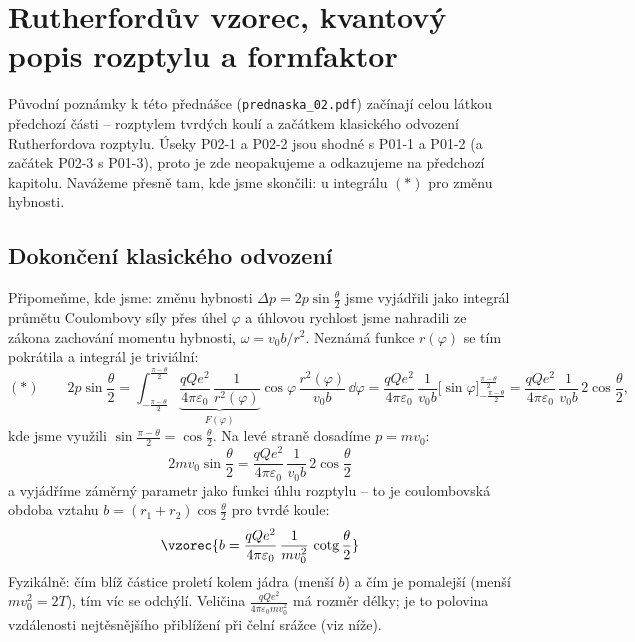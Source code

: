 \section{Rutherfordův vzorec, kvantový popis rozptylu a formfaktor}

Původní poznámky k této přednášce (\texttt{prednaska\_02.pdf}) začínají celou látkou předchozí části -- rozptylem tvrdých koulí a začátkem klasického odvození Rutherfordova rozptylu. Úseky P02-1 a P02-2 jsou shodné s P01-1 a P01-2 (a začátek P02-3 s P01-3), proto je zde neopakujeme a odkazujeme na předchozí kapitolu. Navážeme přesně tam, kde jsme skončili: u integrálu $(*)$ pro změnu hybnosti.

\subsection{Dokončení klasického odvození}

Připomeňme, kde jsme: změnu hybnosti $\Delta p = 2p\sin\frac{\theta}{2}$ jsme vyjádřili jako integrál průmětu Coulombovy síly přes úhel $\varphi$ a úhlovou rychlost jsme nahradili ze zákona zachování momentu hybnosti, $\omega = v_0 b/r^2$. Neznámá funkce $r(\varphi)$ se tím pokrátila a integrál je triviální:
\begin{equation}
  (*)\qquad 2p\sin\frac{\theta}{2}
  = \int_{-\frac{\pi-\theta}{2}}^{\frac{\pi-\theta}{2}}
    \underbrace{\frac{qQe^2}{4\pi\varepsilon_0}\,\frac{1}{r^2(\varphi)}}_{F(\varphi)}\cos\varphi\,\frac{r^2(\varphi)}{v_0 b}\,\dd\varphi
  = \frac{qQe^2}{4\pi\varepsilon_0}\,\frac{1}{v_0 b}\Big[\sin\varphi\Big]_{-\frac{\pi-\theta}{2}}^{\frac{\pi-\theta}{2}}
  = \frac{qQe^2}{4\pi\varepsilon_0}\,\frac{1}{v_0 b}\,2\cos\frac{\theta}{2},
\end{equation}
kde jsme využili $\sin\frac{\pi-\theta}{2} = \cos\frac{\theta}{2}$. Na levé straně dosadíme $p = m v_0$:
\begin{equation}
  2 m v_0 \sin\frac{\theta}{2} = \frac{qQe^2}{4\pi\varepsilon_0}\,\frac{1}{v_0 b}\,2\cos\frac{\theta}{2}
\end{equation}
a vyjádříme záměrný parametr jako funkci úhlu rozptylu -- to je coulombovská obdoba vztahu $b=(r_1+r_2)\cos\frac{\theta}{2}$ pro tvrdé koule:
\begin{equation}
  \vzorec{b = \frac{qQe^2}{4\pi\varepsilon_0}\,\frac{1}{m v_0^2}\,\operatorname{cotg}\frac{\theta}{2}}
\end{equation}
Fyzikálně: čím blíž částice proletí kolem jádra (menší $b$) a čím je pomalejší (menší $m v_0^2 = 2T$), tím víc se odchýlí. Veličina $\frac{qQe^2}{4\pi\varepsilon_0 m v_0^2}$ má rozměr délky; je to polovina vzdálenosti nejtěsnějšího přiblížení při čelní srážce (viz níže).

